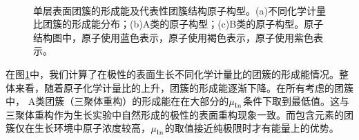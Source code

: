 \begin{figure}[!htb]
    \\[-1ex]
    \caption{单层表面团簇的形成能及代表性团簇结构原子构型。(a)不同化学计量比团簇的形成能分布；(b)A类的原子构型；(c)B类的原子构型。原子结构图中，原子使用蓝色表示，原子使用褐色表示，原子使用紫色表示。}
    \label{fig:IS_DFT_2InSb_InxSbxT_All}
\end{figure}

在图\ref{fig:IS_DFT_2InSb_InxSbxT_All}中，我们计算了在极性的表面生长不同化学计量比的团簇的形成能情况。整体来看，随着原子化学计量比的上升，团簇的形成能逐渐下降。在所有考虑的团簇中， A类团簇（三聚体重构）的形成能在在大部分的$\it \mu_{\rm In}^{\rm } \it$条件下取到最低值。这与三聚体重构作为生长实验中自然形成的极性的表面重构现象一致。而包含元素的团簇仅在生长环境中原子浓度较高，$\it \mu_{\rm In}^{\rm } \it$的取值接近纯极限时才有能量上的优势。

